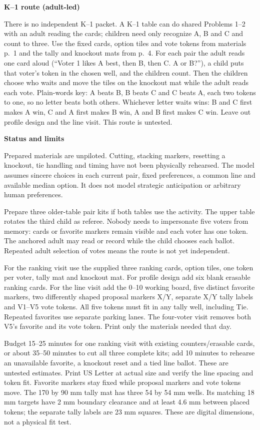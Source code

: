 \documentclass[11pt,letterpaper]{article}
\newcommand{\heading}[1]{\par\vspace{4pt}{\large\bfseries #1}\par}
\newcommand{\sub}[1]{\par\textbf{#1}\par}
\begin{document}
\sub{K--1 route (adult-led)}
There is no independent K--1 packet. A K--1 table can do shared Problems 1--2 with an adult reading the cards; children need only recognize A, B and C and count to three. Use the fixed cards, option tiles and vote tokens from materials p.~1 and the tally and knockout mats from p.~4. For each pair the adult reads one card aloud (``Voter 1 likes A best, then B, then C. A or B?''), a child puts that voter's token in the chosen well, and the children count. Then the children choose who waits and move the tiles on the knockout mat while the adult reads each vote. Plain-words key: A beats B, B beats C and C beats A, each two tokens to one, so no letter beats both others. Whichever letter waits wins: B and C first makes A win, C and A first makes B win, A and B first makes C win. Leave out profile design and the line visit. This route is untested.

\sub{Status and limits}
Prepared materials are unpiloted. Cutting, stacking markers, resetting a knockout, tie handling and timing have not been physically rehearsed. The model assumes sincere choices in each current pair, fixed preferences, a common line and available median option. It does not model strategic anticipation or arbitrary human preferences.
\newpage
\heading{Preparation and launch}
Prepare three older-table pair kits if both tables use the activity. The upper table rotates the third child as referee. Nobody needs to impersonate five voters from memory: cards or favorite markers remain visible and each voter has one token. The anchored adult may read or record while the child chooses each ballot. Repeated adult selection of votes means the route is not yet independent.

For the ranking visit use the supplied three ranking cards, option tiles, one token per voter, tally mat and knockout mat. For profile design add six blank erasable ranking cards. For the line visit add the 0--10 working board, five distinct favorite markers, two differently shaped proposal markers X/Y, separate X/Y tally labels and V1--V5 vote tokens. All five tokens must fit in any tally well, including Tie. Repeated favorites use separate parking lanes. The four-voter visit removes both V5's favorite and its vote token. Print only the materials needed that day.

Budget 15--25 minutes for one ranking visit with existing counters/erasable cards, or about 35--50 minutes to cut all three complete kits; add 10 minutes to rehearse an unavailable favorite, a knockout reset and a tied line ballot. These are untested estimates. Print US Letter at actual size and verify the line spacing and token fit. Favorite markers stay fixed while proposal markers and vote tokens move. The 170 by 90 mm tally mat has three 54 by 54 mm wells. Its matching 18 mm targets have 2 mm boundary clearance and at least 4.6 mm between placed tokens; the separate tally labels are 23 mm squares. These are digital dimensions, not a physical fit test.
\end{document}
